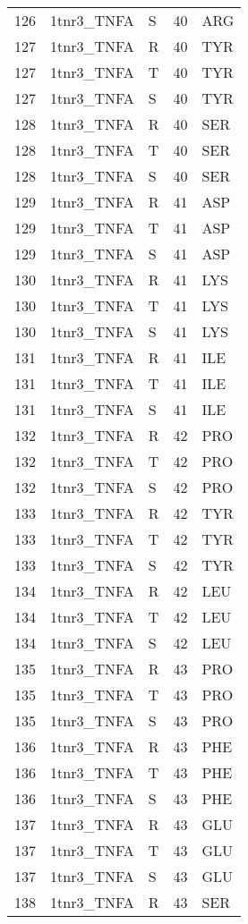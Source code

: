 \begin{longtable}[l]{l|l|l|l|l}
	126 & 1tnr3_TNFA & S & 40 & ARG \\
	127 & 1tnr3_TNFA & R & 40 & TYR \\
	127 & 1tnr3_TNFA & T & 40 & TYR \\
	127 & 1tnr3_TNFA & S & 40 & TYR \\
	128 & 1tnr3_TNFA & R & 40 & SER \\
	128 & 1tnr3_TNFA & T & 40 & SER \\
	128 & 1tnr3_TNFA & S & 40 & SER \\
	129 & 1tnr3_TNFA & R & 41 & ASP \\
	129 & 1tnr3_TNFA & T & 41 & ASP \\
	129 & 1tnr3_TNFA & S & 41 & ASP \\
	130 & 1tnr3_TNFA & R & 41 & LYS \\
	130 & 1tnr3_TNFA & T & 41 & LYS \\
	130 & 1tnr3_TNFA & S & 41 & LYS \\
	131 & 1tnr3_TNFA & R & 41 & ILE \\
	131 & 1tnr3_TNFA & T & 41 & ILE \\
	131 & 1tnr3_TNFA & S & 41 & ILE \\
	132 & 1tnr3_TNFA & R & 42 & PRO \\
	132 & 1tnr3_TNFA & T & 42 & PRO \\
	132 & 1tnr3_TNFA & S & 42 & PRO \\
	133 & 1tnr3_TNFA & R & 42 & TYR \\
	133 & 1tnr3_TNFA & T & 42 & TYR \\
	133 & 1tnr3_TNFA & S & 42 & TYR \\
	134 & 1tnr3_TNFA & R & 42 & LEU \\
	134 & 1tnr3_TNFA & T & 42 & LEU \\
	134 & 1tnr3_TNFA & S & 42 & LEU \\
	135 & 1tnr3_TNFA & R & 43 & PRO \\
	135 & 1tnr3_TNFA & T & 43 & PRO \\
	135 & 1tnr3_TNFA & S & 43 & PRO \\
	136 & 1tnr3_TNFA & R & 43 & PHE \\
	136 & 1tnr3_TNFA & T & 43 & PHE \\
	136 & 1tnr3_TNFA & S & 43 & PHE \\
	137 & 1tnr3_TNFA & R & 43 & GLU \\
	137 & 1tnr3_TNFA & T & 43 & GLU \\
	137 & 1tnr3_TNFA & S & 43 & GLU \\
	138 & 1tnr3_TNFA & R & 43 & SER \\

\end{longtable}
